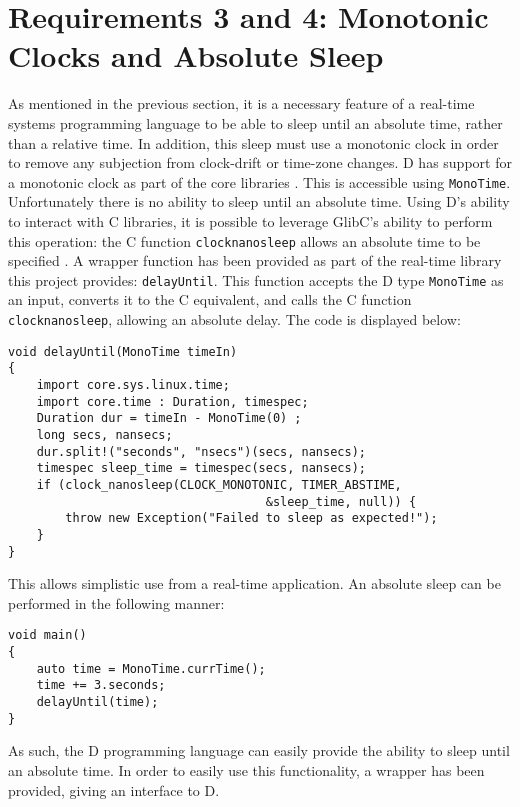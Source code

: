 \section{Requirements 3 and 4: Monotonic Clocks and Absolute Sleep}
As mentioned in the previous section, it is a necessary feature of a real-time 
systems programming language to be able to sleep until an absolute time, rather 
than a relative time. In addition, this sleep must use a monotonic clock in order 
to remove any subjection from clock-drift or time-zone changes. D has support 
for a monotonic clock as part of the core libraries 
\cite{dlang-core-time}. This is accessible using 
\texttt{MonoTime}. Unfortunately there is no ability to sleep until an 
absolute time. Using D's ability to interact with C libraries, it is possible 
to leverage GlibC's ability to perform this operation: the C function 
\texttt{clock\textunderscore{}nanosleep} allows an absolute time to be specified
\cite{clock-nanosleep}.
A wrapper function has been provided as part of the real-time library this 
project provides: \texttt{delayUntil}.
This function accepts the D type \texttt{MonoTime} as an input, converts it to the C 
equivalent, and calls the C function \texttt{clock\textunderscore{}nanosleep}, 
allowing an absolute delay. The code is displayed below: 
\begin{lstlisting}
void delayUntil(MonoTime timeIn)
{
    import core.sys.linux.time; 
    import core.time : Duration, timespec; 
    Duration dur = timeIn - MonoTime(0) ;
    long secs, nansecs; 
    dur.split!("seconds", "nsecs")(secs, nansecs); 
    timespec sleep_time = timespec(secs, nansecs); 
    if (clock_nanosleep(CLOCK_MONOTONIC, TIMER_ABSTIME, 
                                    &sleep_time, null)) {
        throw new Exception("Failed to sleep as expected!"); 
    }
}
\end{lstlisting}
This allows simplistic use from a real-time application. An absolute sleep can 
be performed in the following manner: 
\begin{lstlisting}
void main()
{
    auto time = MonoTime.currTime(); 
    time += 3.seconds; 
    delayUntil(time);
}
\end{lstlisting}
As such, the D programming language can easily provide the ability to sleep 
until an absolute time. In order to easily use this functionality, a 
wrapper has been provided, giving an interface to D.

